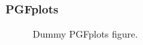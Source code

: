 \begin{frame}
    \frametitle{PGFplots}
    \begin{figure}[t]
        \begin{center}
            \caption{Dummy PGFplots figure.}
            \label{fig:pgfplots1}  
        \end{center}
    \end{figure}
\end{frame}